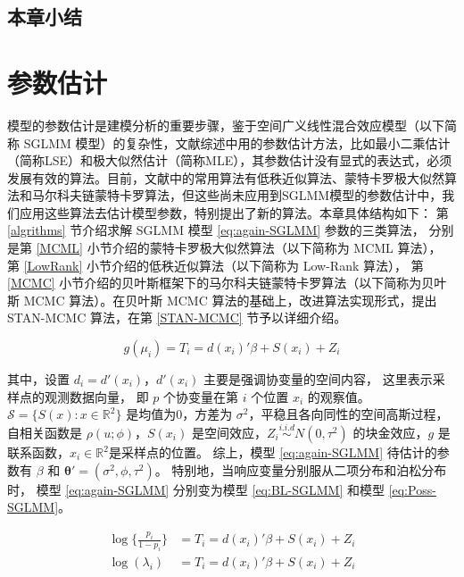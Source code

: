 \documentclass[12pt,a4paper,UTF8,twoside]{book}
\theoremstyle{definition}
\theoremstyle{definition}
\theoremstyle{definition}
\theoremstyle{remark}
\begin{document}
\hypertarget{sec:models}{%
\section{本章小结}\label{sec:models}}

\hypertarget{algorithms}{%
\chapter{参数估计}\label{algorithms}}

模型的参数估计是建模分析的重要步骤，鉴于空间广义线性混合效应模型（以下简称
SGLMM
模型）的复杂性，文献综述中用的参数估计方法，比如最小二乘估计（简称LSE）和极大似然估计（简称MLE），其参数估计没有显式的表达式，必须发展有效的算法。目前，文献中的常用算法有低秩近似算法、蒙特卡罗极大似然算法和马尔科夫链蒙特卡罗算法，但这些尚未应用到SGLMM模型的参数估计中，我们应用这些算法去估计模型参数，特别提出了新的算法。本章具体结构如下：
第 \ref{algrithms} 节介绍求解 SGLMM 模型 \eqref{eq:again-SGLMM}
参数的三类算法， 分别是第 \ref{MCML}
小节介绍的蒙特卡罗极大似然算法（以下简称为 MCML 算法）， 第
\ref{LowRank} 小节介绍的低秩近似算法（以下简称为 Low-Rank 算法）， 第
\ref{MCMC}
小节介绍的贝叶斯框架下的马尔科夫链蒙特卡罗算法（以下简称为贝叶斯 MCMC
算法）。在贝叶斯 MCMC 算法的基础上，改进算法实现形式，提出 STAN-MCMC
算法，在第 \ref{STAN-MCMC} 节予以详细介绍。

\begin{equation}
g(\mu_i) =T_{i} =d(x_i)'\beta + S(x_i) + Z_i \label{eq:again-SGLMM}
\end{equation}

\noindent 其中，设置 \(d_{i} = d'(x_i)\)，\(d'(x_i)\)
主要是强调协变量的空间内容， 这里表示采样点的观测数据向量， 即 \(p\)
个协变量在第 \(i\) 个位置 \(x_i\) 的观察值。
\(\mathcal{S} = \{S(x): x \in \mathbb{R}^2\}\) 是均值为0，方差为
\(\sigma^2\)，平稳且各向同性的空间高斯过程，自相关函数是
\(\rho(u;\phi)\)，\(S(x_i)\)
是空间效应，\(Z_i \stackrel{i.i.d}{\sim} N(0,\tau^2)\) 的块金效应，\(g\)
是联系函数，\(x_i \in \mathbb{R}^2\)是采样点的位置。 综上，模型
\eqref{eq:again-SGLMM} 待估计的参数有 \(\beta\) 和
\(\boldsymbol{\theta}' = (\sigma^2,\phi,\tau^2)\)。
特别地，当响应变量分别服从二项分布和泊松分布时， 模型
\eqref{eq:again-SGLMM} 分别变为模型 \eqref{eq:BL-SGLMM} 和模型
\eqref{eq:Poss-SGLMM}。

\begin{align}
\log\{\frac{p_i}{1-p_i}\} & = T_{i} = d(x_i)'\beta + S(x_i) + Z_i  \label{eq:BL-SGLMM}\\
\log(\lambda_i)           & = T_{i} = d(x_i)'\beta + S(x_i) + Z_i  \label{eq:Poss-SGLMM}
\end{align}
\end{document}
